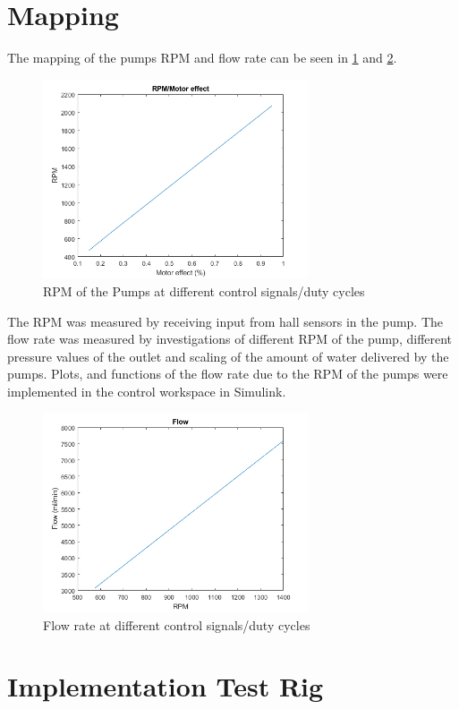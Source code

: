 \section{Mapping}
The mapping of the pumps RPM and flow rate can be seen in \ref{fig:RPM} and \ref{fig:Flowrate}.
\begin{figure}[h]
    \centering
    \includegraphics[width=0.7\textwidth]{RPM.png}
    \caption{RPM of the Pumps at different control signals/duty cycles}
    \label{fig:RPM}
\end{figure}
The RPM was measured by receiving input from hall sensors in the pump. The flow rate was measured by investigations of different RPM of the pump, different pressure values of the outlet and scaling of the amount of water delivered by the pumps. Plots, and functions of the flow rate due to the RPM of the pumps were implemented in the control workspace in Simulink.  
\begin{figure}[h]
    \centering
    \includegraphics[width=0.7\textwidth]{Flow.png}
    \caption{Flow rate at different control signals/duty cycles}
    \label{fig:Flowrate}
\end{figure}

\section{Implementation Test Rig}
